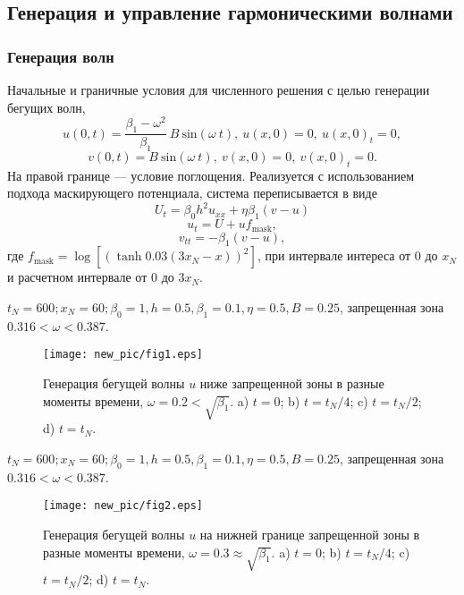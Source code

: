 \subsection{Генерация и управление гармоническими волнами}

\begin{frame}
	\frametitle{Генерация волн}
	Начальные и граничные условия для численного решения с целью генерации бегущих волн,
	$$
	u(0,t)=\frac{\beta_1-\omega^2}{\beta_1}~B~ {\text{sin}} (\omega ~t),~u(x,0)=0, ~u(x,0)_t=0,
	$$
	$$
	v(0,t)=B ~{\text{sin}} (\omega ~t),~v(x,0)=0, ~v(x,0)_t=0.
	$$
	На правой границе --- условие поглощения. Реализуется с использованием подхода маскирующего потенциала, система переписывается в виде
	$$
	U_{t}=\beta_0 h^2 u_{xx}+\eta \beta_1 (v-u)
	$$
	$$
	u_{t}=U + u f_{\text{mask}},
	$$
	$$
	v_{tt}=-\beta_1 (v-u),
	$$
	где $ f_{\text {mask}} = \log \left[ \left(\tanh {0.03 (3 x_N - x)} \right)^2 \right] $, при интервале интереса от $0$ до $x_N$ и расчетном интервале от $0$ до $3 x_N$.
\end{frame}

\begin{frame}
	\begin{small}
	$t_N = 600; x_N = 60;\beta_0=1, h = 0.5, \beta_1 = 0.1, \eta = 0.5,  B=0.25$, запрещенная зона $0.316<\omega<0.387$.
	\end{small}
	\begin{figure}
		\begin{center}
			\texttt{[image: new\_pic/fig1.eps]}
		\end{center}
		Генерация бегущей волны $u$ ниже запрещенной зоны в разные моменты времени, $\omega = 0.2 < \sqrt{\beta_1}$.  a) $t=0$; b) $ t=t_N/4$; c) $t=t_N/2$; d) $t=t_N$.
	\end{figure}
\end{frame}

\begin{frame}
	\begin{small}
		$t_N = 600; x_N = 60;\beta_0=1, h = 0.5, \beta_1 = 0.1, \eta = 0.5,  B=0.25$, запрещенная зона $0.316<\omega<0.387$.
	\end{small}
	\begin{figure}
		\begin{center}
			\texttt{[image: new\_pic/fig2.eps]}
		\end{center}
		Генерация бегущей волны $u$ на нижней границе запрещенной зоны в разные моменты времени, $\omega = 0.3 \approx \sqrt{\beta_1}$.  a) $t=0$; b) $ t=t_N/4$; c) $t=t_N/2$; d) $t=t_N$.
	\end{figure}
\end{frame}

